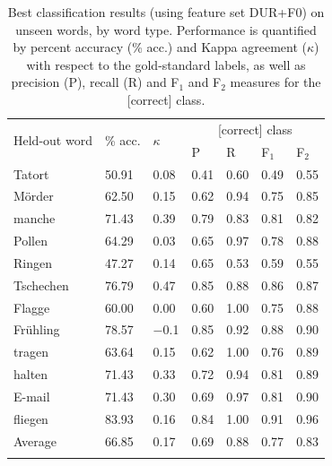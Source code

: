 	
	
	
		\begin{table}
			\centering
			\caption[Best classification results on unseen words, by word type]{Best classification results (using feature set DUR+F0) on unseen words, by word type. 
			Performance is quantified by percent accuracy (\% acc.) and Kappa agreement ($\kappa$) with respect to the gold-standard labels, as well as precision (P), recall (R) and F$_1$ and F$_2$ measures for the [correct] class.			
			}
			\begin{tabularx}{.8\textwidth}{lXXXXXX}			
			\toprule
			\multirow{2}{*}{Held-out word} & \multirow{2}{*}{\% acc.} & \multirow{2}{*}{$\kappa$} & \multicolumn{4}{c}{[correct] class} \\
			\cmidrule(lr){4-7}
			& & & P & R & F$_1$ & F$_2$ \\
			\midrule
Tatort	&	50.91	&	0.08	&	0.41	&	0.60	&	0.49	&	0.55	\\
M\"order	&	62.50	&	0.15	&	0.62	&	0.94	&	0.75	&	0.85	\\
manche	&	71.43	&	0.39	&	0.79	&	0.83	&	0.81	&	0.82	\\
Pollen	&	64.29	&	0.03	&	0.65	&	0.97	&	0.78	&	0.88	\\
Ringen	&	47.27	&	0.14	&	0.65	&	0.53	&	0.59	&	0.55	\\
Tschechen	&	76.79	&	0.47	&	0.85	&	0.88	&	0.86	&	0.87	\\
Flagge	&	60.00	&	0.00	&	0.60	&	1.00	&	0.75	&	0.88	\\
Fr\"uhling	&	78.57	&	$-$0.1	&	0.85	&	0.92	&	0.88	&	0.90	\\
tragen	&	63.64	&	0.15	&	0.62	&	1.00	&	0.76	&	0.89	\\
halten	&	71.43	&	0.33	&	0.72	&	0.94	&	0.81	&	0.89	\\
E-mail	&	71.43	&	0.30	&	0.69	&	0.97	&	0.81	&	0.90	\\
fliegen	&	83.93	&	0.16	&	0.84	&	1.00	&	0.91	&	0.96	\\
\addlinespace													
Average	&	66.85	&	0.17	&	0.69	&	0.88	&	0.77	&	0.83	\\
			\bottomrule
			\label{tab:results:wordtypes}
			\end{tabularx}
		\end{table}
	
	
	
